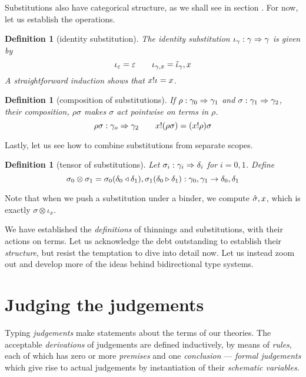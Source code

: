 \documentclass{jfp1}
\newtheorem{definition}[theorem]{Definition}
\newcommand{\emp}{\varepsilon}
\begin{document}
Substitutions also have categorical structure, as we shall see in
section \label{sec:sbstcat}. For now, let us establish the operations.

\newcommand{\isu}{\iota}
\begin{definition}[identity substitution]
  The identity substitution $\isu_\gamma : \gamma\su\gamma$ is given by
  \[\isu_\emp = \emp \qquad \isu_{\gamma,x} = \wka\isu_\gamma,x
  \]
  A straightforward induction shows that $\sel x\isu = x$.
\end{definition}

\begin{definition}[composition of substitutions]
  If $\rho : \gamma_0\Rightarrow\gamma_1$ and $\sigma : \gamma_1\Rightarrow\gamma_2$, their
  composition, $\rho\sigma$ makes $\sigma$ act \emph{pointwise} on terms in $\rho$.
  \[\rho\sigma : \gamma_o\Rightarrow\gamma_2\qquad x!(\rho\sigma) =
    (x!\rho)\sigma
  \]
\end{definition}

Lastly, let us see how to combine substitutions from separate scopes.

\begin{definition}[tensor of substitutions]
  Let $\sigma_i : \gamma_i\Rightarrow\delta_i$ for $i=0,1$. Define
  \[
    \sigma_0\otimes\sigma_1 =
    \sigma_0(\delta_0 \triangleleft \delta_1),\sigma_1(\delta_0 \triangleright \delta_1)
    : \gamma_0,\gamma_1 \to \delta_0,\delta_1
  \]
\end{definition}

Note that when we push a substitution under a binder, we compute
$\hat\sigma,x$, which is exactly $\sigma\otimes\isu_x$.

We have established the \emph{definitions} of thinnings and
substitutions, with their actions on terms. Let us acknowledge the
debt outstanding to establish their \emph{structure}, but resist the
temptation to dive into detail now. Let us instead zoom out and
develop more of the ideas behind bidirectional type systems.



\section{Judging the judgements}

Typing \emph{judgements} make statements about the terms of our
theories. The acceptable \emph{derivations} of judgements are defined
inductively, by means of \emph{rules}, each of which has zero or
more \emph{premises} and one \emph{conclusion} ---
\emph{formal judgements} which give rise to actual judgements by
instantiation of their \emph{schematic variables}.
\end{document}
